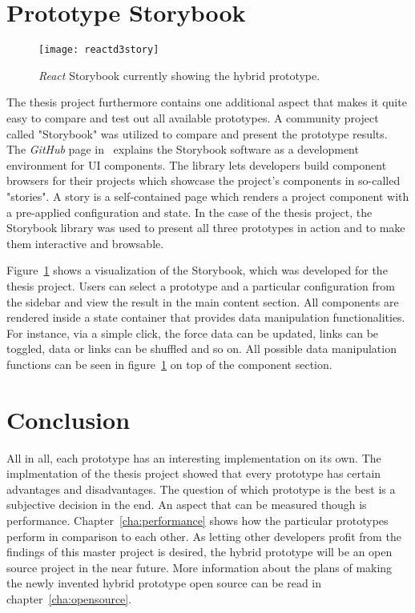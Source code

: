 \section{Prototype Storybook}

\begin{figure}
  \centering
  \texttt{[image: reactd3story]}
  \caption{\emph{React} Storybook currently showing the hybrid prototype.}
  \label{fig:reactD3stroy}
\end{figure}

The thesis project furthermore contains one additional aspect that makes it quite easy to compare and test out all available prototypes. A community project called "Storybook" was utilized to compare and present the prototype results. The \emph{GitHub} page in~\cite{ReactStorybook} explains the Storybook software as a development environment for UI components. The library lets developers build component browsers for their projects which showcase the project's components in so-called "stories". A story is a self-contained page which renders a project component with a pre-applied configuration and state. In the case of the thesis project, the Storybook library was used to present all three prototypes in action and to make them interactive and browsable. 

Figure~\ref{fig:reactD3stroy} shows a visualization of the Storybook, which was developed for the thesis project. Users can select a prototype and a particular configuration from the sidebar and view the result in the main content section. All components are rendered inside a state container that provides data manipulation functionalities. For instance, via a simple click, the force data can be updated, links can be toggled, data or links can be shuffled and so on. All possible data manipulation functions can be seen in figure~\ref{fig:reactD3stroy} on top of the component section.

\section{Conclusion}

All in all, each prototype has an interesting implementation on its own. The implmentation of the thesis project showed that every prototype has certain advantages and disadvantages. The question of which prototype is the best is a subjective decision in the end. An aspect that can be measured though is performance. Chapter~\ref{cha:performance} shows how the particular prototypes perform in comparison to each other. As letting other developers profit from the findings of this master project is desired, the hybrid prototype will be an open source project in the near future. More information about the plans of making the newly invented hybrid prototype open source can be read in chapter~\ref{cha:opensource}.